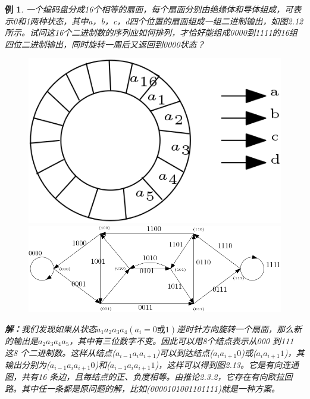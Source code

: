 \documentclass[11pt,a4paper,openany]{book}
\newtheorem{sample}{\textbf{例}}[section]
\begin{document}
\begin{sample}
一个编码盘分成16个相等的扇面，每个扇面分别由绝缘体和导体组成，可表示0和1两种状态，其中a，b，c，d四个位置的扇面组成一组二进制输出，如图2.12所示。试问这16个二进制数的序列应如何排列，才恰好能组成0000到1111的16组四位二进制输出，同时旋转一周后又返回到0000状态？\\
\begin{figure}[h]
  \centering
  \vspace{-10pt}
  \begin{minipage}[!ht]{.35\linewidth}
  \includegraphics[width=1.0\linewidth]{2.11.png}
  \caption{}
  \end{minipage}
  \begin{minipage}[!ht]{.6\linewidth}
   \includegraphics[width=1.0\linewidth]{2.12.png}
  \caption{}
  \end{minipage}
  \vspace{-20pt}
\end{figure}
\textbf{解：}我们发现如果从状态$a_1 a_2 a_3 a_4 (a_i=0或1)$逆时针方向旋转一个扇面，那么新的输出是$a_2 a_3 a_4 a_5$，其中有三位数字不变。因此可以用8个结点表示从000 到111 这8 个二进制数。这样从结点($a_{i-1} a_i a_{i+1}$)可以到达结点($a_i a_{i+1} 0$)或($a_i a_{i+1} 1$)，其输出分别为($a_{i-1} a_i a_{i+1} 0$)和($a_{i-1} a_i a_{i+1} 1$)，这样可以得到图2.13。它是有向连通图，共有16 条边，且每结点的正、负度相等。由推论2.3.2，它存在有向欧拉回路。其中任一条都是原问题的解，比如(0000101001101111)就是一种方案。\\
\end{sample}
\end{document}
